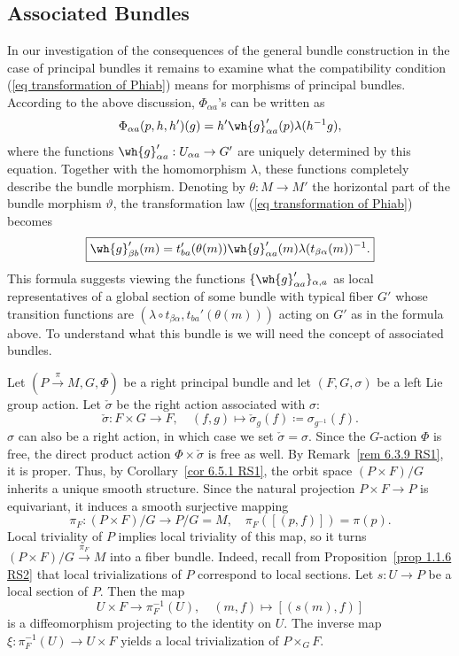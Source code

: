 \subsection{Associated Bundles}\label{sec: assoc bundles}


In our investigation of the consequences of the general bundle construction in the case of principal bundles it remains to examine what the compatibility condition (\ref{eq transformation of Phiab}) means for morphisms of principal bundles. According to the above discussion, $\Phi_{\alpha a}$'s can be written as
\[\Phi_{\alpha a}(p,h,h')(g)=h'\wh{g}'_{\alpha a}(p)\lambda(h^{-1}g),\]
where the functions $\wh{g}'_{\alpha a}:U_{\alpha a}\to G'$ are uniquely determined by this equation.  Together with the homomorphism $\lambda$, these functions completely describe the bundle morphism. Denoting by $\theta:M\to M'$ the horizontal part of the bundle morphism $\vartheta$, the transformation law (\ref{eq transformation of Phiab}) becomes
\[\boxed{\wh{g}'_{\beta b}(m)=t_{ba}'(\theta(m))\wh{g}_{\alpha a}'(m)\lambda(t_{\beta\alpha}(m))^{-1}.}\label{eq trans rule for ghat}\]
This formula suggests viewing the functions $\{\wh{g}'_{\alpha a}\}_{\alpha,a}$ as local representatives of a global section of some bundle with typical fiber $G'$ whose transition functions are $(\lambda\circ t_{\beta\alpha},t_{ba}'(\theta(m)))$ acting on $G'$ as in the formula above. To understand what this bundle is we will need the concept of associated bundles.

Let $(P\overset{\pi}{\to}M,G,\Phi)$ be a right principal bundle and let $(F,G,\sigma)$ be a left Lie group action. Let $\check\sigma$ be the right action associated with $\sigma$:
\[\check\sigma:F\times G\to F,\quad (f,g)\mapsto \check{\sigma}_g(f)\coloneqq \sigma_{g^{-1}}(f).\]
$\sigma$ can also be a right action, in which case we set $\check\sigma=\sigma$. Since the $G$-action $\Phi$ is free, the direct product action $\Phi\times \check\sigma$ is free as well. By Remark~\ref{rem 6.3.9 RS1}, it is proper. Thus, by Corollary~\ref{cor 6.5.1 RS1}, the orbit space $(P\times F)\slash G$ inherits a unique smooth structure. Since the natural projection $P\times F\to P$ is equivariant, it induces a smooth surjective mapping
\[\pi_F:(P\times F)\slash G\to P\slash G=M,\quad \pi_F([(p,f)])=\pi(p).\]
Local triviality of $P$ implies local triviality of this map, so it turns $(P\times F)\slash G \overset{\pi_F}{\to } M$ into a fiber bundle. Indeed, recall from Proposition~\ref{prop 1.1.6 RS2} that local trivializations of $P$ correspond to local sections. Let $s:U\to P$ be a local section of $P$. Then the map
\[U\times F\to \pi_F^{-1}(U),\quad (m,f)\mapsto [(s(m),f)]\]
is a diffeomorphism projecting to the identity on $U$. The inverse map $\xi:\pi_F^{-1}(U)\to U\times F$ yields a local trivialization of $P\times_G F$.

